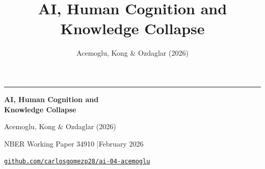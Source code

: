 \documentclass[aspectratio=169,10pt]{beamer}
\title{AI, Human Cognition and Knowledge Collapse}
\subtitle{Acemoglu, Kong \& Ozdaglar (2026)}
\author{}
\date{}
\begin{document}
\begin{frame}[plain]
  \vspace{.7cm}
  {\color{Teal}\rule{1.8cm}{3pt}}\par
  \vspace{.45cm}
  {\color{Navy}\fontsize{25}{29}\selectfont\bfseries
    AI, Human Cognition and\\ Knowledge Collapse\par}
  \vspace{.35cm}
  {\large Acemoglu, Kong \& Ozdaglar (2026)}\par
  \vspace{.75cm}
  {\color{Ink}NBER Working Paper 34910 \enspace\textcolor{Teal}{|}\enspace February 2026}\par
  \vfill
  \href{https://github.com/carlosgomezp28/ai-04-acemoglu}{%
    \color{Teal}\texttt{github.com/carlosgomezp28/ai-04-acemoglu}}
  \vspace{.35cm}
\end{frame}
\end{document}
